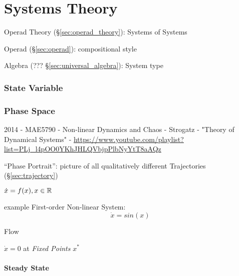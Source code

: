 \part{Systems Theory}\label{sec:systems_theory}


Operad Theory (\S\ref{sec:operad_theory}): Systems of Systems

Operad (\S\ref{sec:operad}): compositional style

Algebra (??? \S\ref{sec:universal_algebra}): System type



\section{State Variable}\label{sec:state_variable}

\section{Phase Space}\label{sec:phase_space}

2014 - MAE5790 - Non-linear Dynamics and Chaos - Strogatz - "Theory of
Dynamical Systems" -
\url{https://www.youtube.com/playlist?list=PLj_l4pOO0YKhJHLQVbjpPlbNyYtT8aAQz}

``Phase Portrait'': picture of all qualitatively different Trajectories
(\S\ref{sec:trajectory})

$\dot{x} = f(x), x \in \mathbb{R}$

example First-order Non-linear System:
\[
  \dot{x} = sin(x)
\]

Flow

$\dot{x} = 0$ at \emph{Fixed Points} $x^*$



\subsection{Steady State}\label{sec:steady_state}

